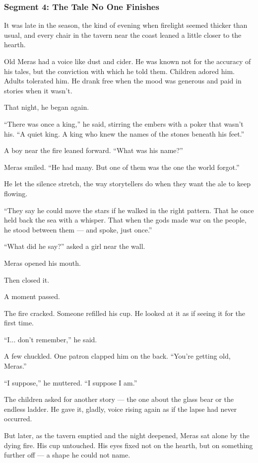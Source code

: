 \documentclass[9pt]{article}
\begin{document}
\newpage

\subsubsection*{Segment 4: The Tale No One Finishes}

It was late in the season, the kind of evening when firelight seemed thicker than usual, and every chair in the tavern near the coast leaned a little closer to the hearth.

Old Meras had a voice like dust and cider. He was known not for the accuracy of his tales, but the conviction with which he told them. Children adored him. Adults tolerated him. He drank free when the mood was generous and paid in stories when it wasn’t.

That night, he began again.

``There was once a king,'' he said, stirring the embers with a poker that wasn’t his. ``A quiet king. A king who knew the names of the stones beneath his feet.''

A boy near the fire leaned forward. ``What was his name?''

Meras smiled. ``He had many. But one of them was the one the world forgot.''

He let the silence stretch, the way storytellers do when they want the ale to keep flowing.

``They say he could move the stars if he walked in the right pattern. That he once held back the sea with a whisper. That when the gods made war on the people, he stood between them — and spoke, just once.''

``What did he say?'' asked a girl near the wall.

Meras opened his mouth.

Then closed it.

A moment passed.

The fire cracked. Someone refilled his cup. He looked at it as if seeing it for the first time.

``I... don’t remember,'' he said.

A few chuckled. One patron clapped him on the back. ``You’re getting old, Meras.''

``I suppose,'' he muttered. ``I suppose I am.''

The children asked for another story — the one about the glass bear or the endless ladder. He gave it, gladly, voice rising again as if the lapse had never occurred.

But later, as the tavern emptied and the night deepened, Meras sat alone by the dying fire. His cup untouched. His eyes fixed not on the hearth, but on something further off — a shape he could not name.
\end{document}
